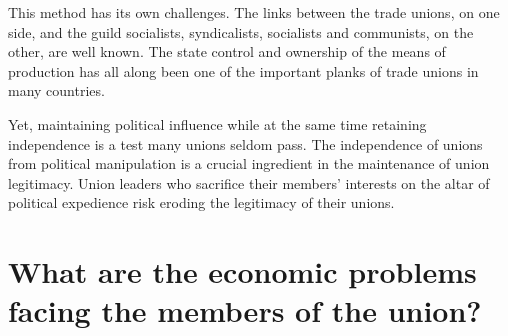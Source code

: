 This method has its own challenges. The links between the trade unions,
on one side, and the guild socialists, syndicalists, socialists and
communists, on the other, are well known. The state control and
ownership of the means of production has all along been one of the
important planks of trade unions in many countries.

Yet, maintaining political influence while at the same time retaining
independence is a test many unions seldom pass. The independence of
unions from political manipulation is a crucial ingredient in the
maintenance of union legitimacy. Union leaders who sacrifice their
members' interests on the altar of political expedience risk eroding the
legitimacy of their unions.


\section{What are the economic problems facing the members of the union?}



